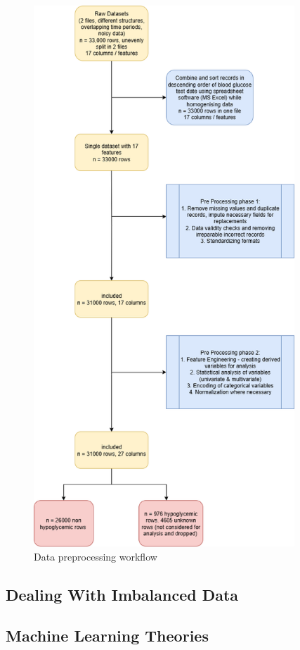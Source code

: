 	\begin{figure}[H]
		\centering
		\includegraphics[height=8in]{figures/dataPreprocessingWf.png}
		\caption{Data preprocessing workflow}
		\label{fig:datapreprocessingwf}
	\end{figure}

	\subsection{Dealing With Imbalanced Data}

	\subsection{Machine Learning Theories}

